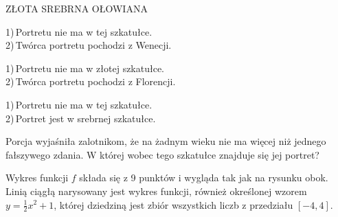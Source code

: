 \documentclass[a4paper,12pt]{article}
\newcommand\<
      {%
        \raise 0.2ex\hbox{%
                          $< \kern-1.85ex \raise 0.09ex\hbox{$\scriptstyle )$}$%
                         }\kern 0.6ex
      }
\begin{document}
\hspace*{10mm} ZŁOTA \hspace{43mm} SREBRNA \hspace{38mm} OŁOWIANA\\[2mm]
\hspace*{1mm}
\fbox
{
\begin{minipage}{35mm}
1)\,Portretu nie ma w tej szkatułce.\\
2)\,Twórca portretu pochodzi z Wenecji.
\end{minipage}
}
\hspace{16mm}
\fbox
{
\begin{minipage}{38mm}
1)\,Portretu nie ma w złotej szkatułce.\\
2)\,Twórca portretu pochodzi z Florencji.
\end{minipage}
}
\hspace{16mm}
\fbox
{
\begin{minipage}{35mm}
1)\,Portretu nie ma w tej szkatułce.\\
2)\,Portret jest w srebrnej szkatułce.
\end{minipage}
}

\vspace*{3mm}

  Porcja wyjaśniła zalotnikom, że na żadnym wieku nie ma więcej niż jednego fałszywego zdania.
  W której wobec tego szkatułce znajduje  się  jej portret?

\noindent
\begin{minipage}{55mm}
Wykres funkcji $f$ składa się z 9 punktów i wygląda tak jak na  rysunku obok.\\
Linią ciągłą narysowany jest wykres funkcji, również określonej wzorem $y = \frac 12 x^2 + 1$, której dziedziną
jest zbiór wszystkich liczb z przedziału $[-4,4]$.
\end{minipage}
\hspace*{5mm}
\begin{minipage}{70mm}
\end{minipage}
\end{document}
